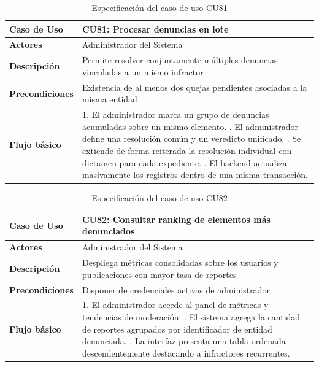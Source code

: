 \begin{table}[H]
\centering
\begin{tabular}{|p{3.2cm}|p{11.3cm}|}
\hline
\textbf{Caso de Uso} & \textbf{CU81: Procesar denuncias en lote} \\ \hline
\textbf{Actores} & Administrador del Sistema \\ \hline
\textbf{Descripción} & Permite resolver conjuntamente múltiples denuncias vinculadas a un mismo infractor \\ \hline
\textbf{Precondiciones} & Existencia de al menos dos quejas pendientes asociadas a la misma entidad \\ \hline
\textbf{Flujo básico} & 
1. El administrador marca un grupo de denuncias acumuladas sobre un mismo elemento. \newline
2. El administrador define una resolución común y un veredicto unificado. \newline
3. Se extiende de forma reiterada la resolución individual con dictamen para cada expediente. \newline
4. El backend actualiza masivamente los registros dentro de una misma transacción. \\ \hline
\end{tabular}
\caption{Especificación del caso de uso CU81}
\label{tab:cu81}
\end{table}

\begin{table}[H]
\centering
\begin{tabular}{|p{3.2cm}|p{11.3cm}|}
\hline
\textbf{Caso de Uso} & \textbf{CU82: Consultar ranking de elementos más denunciados} \\ \hline
\textbf{Actores} & Administrador del Sistema \\ \hline
\textbf{Descripción} & Despliega métricas consolidadas sobre los usuarios y publicaciones con mayor tasa de reportes \\ \hline
\textbf{Precondiciones} & Disponer de credenciales activas de administrador \\ \hline
\textbf{Flujo básico} & 
1. El administrador accede al panel de métricas y tendencias de moderación. \newline
2. El sistema agrega la cantidad de reportes agrupados por identificador de entidad denunciada. \newline
3. La interfaz presenta una tabla ordenada descendentemente destacando a infractores recurrentes. \\ \hline
\end{tabular}
\caption{Especificación del caso de uso CU82}
\label{tab:cu82}
\end{table}

